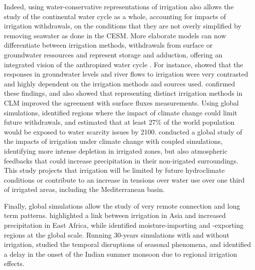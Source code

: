 Indeed, using water-conservative representations of irrigation also allows the study of the continental water cycle as a whole, accounting for impacts of irrigation withdrawals, on the conditions that they are not overly simplified by removing seawater as done in the CESM. More elaborate models can now differentiate between irrigation methods, withdrawals from surface or groundwater ressources and represent storage and adduction, offering an integrated vision of the anthropized water cycle \citep{decharme_simple_2025}.
For instance, \citet{leng_significant_2017} showed that the responses in groundwater levels and river flows to irrigation were very contrasted and highly dependent on the irrigation methods and sources used. \citet{yao_implementation_2022} confirmed these findings, and also showed that representing distinct irrigation methods in CLM improved the agreement with surface fluxes measurements.
Using global simulations, \citet{costantini_projected_2023} identified regions where the impact of climate change could limit future withdrawals, and estimated that at least 27\% of the world population would be exposed to water scarcity issues by 2100.
\citet{arboleda-obando_joint_2025} conducted a global study of the impacts of irrigation under climate change with coupled simulations, identifying more intense depletion in irrigated zones, but also atmospheric feedbacks that could increase precipitation in their non-irigated surroundings. This study projects that irrigation will be limited by future hydroclimate conditions or contribute to an increase in tensions over water use over one third of irrigated areas, including the Mediterranean basin.

Finally, global simulations allow the study of very remote connection and long term patterns. \citet{de_vrese_asian_2016} highlighted a link between irrigation in Asia and increased precipitation in East Africa, while \citet{wei_where_2013} identified moisture-importing and -exporting regions at the global scale. Running 30-years simulations with and without irrigation, \citet{guimberteau_global_2012} studied the temporal disruptions of seasonal phenomena, and identified a delay in the onset of the Indian summer monsoon due to regional irrigation effects.

\hfill

